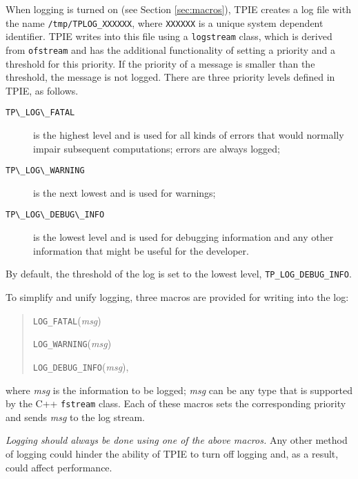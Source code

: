 When logging is turned on (see Section \ref{sec:macros}), TPIE creates a log file with the name \verb|/tmp/TPLOG_XXXXXX|, where \verb|XXXXXX| is a unique system dependent identifier. TPIE writes into this file using a \verb|logstream| class, which is derived from \verb|ofstream| and has the additional functionality of setting a priority and a threshold for this priority. If the priority of a message is smaller than the threshold, the message is not logged. There are three priority levels defined in TPIE, as follows.
\begin{description}
\item[\verb|TP\_LOG\_FATAL|] is the highest level and is used for all kinds of errors that would normally impair subsequent computations; errors are always logged;
\item[\verb|TP\_LOG\_WARNING|] is the next lowest and is used for warnings;
\item[\verb|TP\_LOG\_DEBUG\_INFO|] is the lowest level and is used for debugging information and any other information that might be useful for the developer.
\end{description}
By default, the threshold of the log is set to the lowest level, \verb|TP_LOG_DEBUG_INFO|.

To simplify and unify logging, three macros are provided for writing into the log: 
\begin{quote}
\verb|LOG_FATAL|({\em msg})

\verb|LOG_WARNING|({\em msg})

\verb|LOG_DEBUG_INFO|({\em msg}),
\end{quote}
where {\em msg} is the information to be logged; {\em msg} can be any type that is supported by the C++ \verb|fstream| class. Each of these macros sets the corresponding priority and sends {\em msg} to the log stream.

{\em Logging should always be done using one of the above macros.} Any other method of logging could hinder the ability of TPIE to turn off logging and, as a result, could affect performance.

